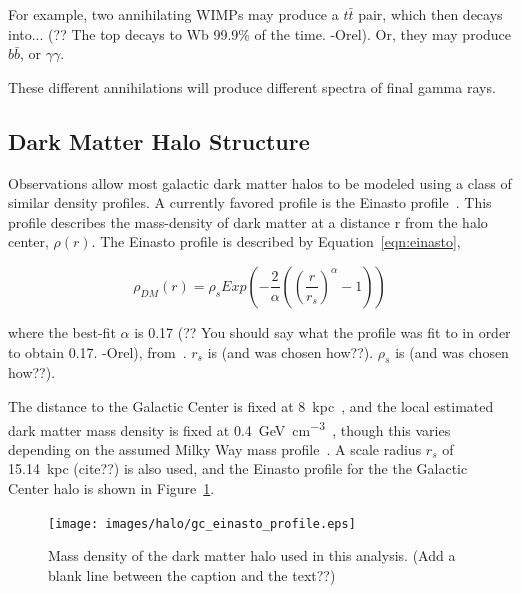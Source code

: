     For example, two annihilating WIMPs may produce a $t\bar{t}$ pair, which then decays into... {\color{red}(?? The top decays to Wb 99.9\% of the time. -Orel)}.
    Or, they may produce $b\bar{b}$, or $\gamma\gamma$.

    These different annihilations will produce different spectra of final gamma rays.
  
  \subsection{Dark Matter Halo Structure}\label{dm_spatial}
    Observations allow most galactic dark matter halos to be modeled using a class of similar density profiles.
    A currently favored profile is the Einasto profile~\cite{einastoprofile1,einastoprofile2}.
    This profile describes the mass-density of dark matter at a distance r from the halo center, $\rho(r)$.
    The Einasto profile is described by Equation~\ref{eqn:einasto},

    \begin{equation} \label{eqn:einasto}
      \rho_{DM} \left( r \right) = \rho_{s} Exp \left( - \frac{2}{\alpha} \left( {\left( \frac{r}{r_s} \right)}^{\alpha} - 1 \right) \right)
    \end{equation}
    
    where the best-fit $\alpha$ is {\color{red}0.17 (?? You should say what the profile was fit to in order to obtain 0.17. -Orel)}, from~\cite{PieriGalaxySims}.
    $r_s$ is {\color{red}(and was chosen how??)}.
    $\rho_s$ is {\color{red}(and was chosen how??)}.

    The distance to the Galactic Center is fixed at \SI{8}{kpc}~\cite{gc_distance_1,gc_distance_2,gc_distance_3}, and the local estimated dark matter mass density is fixed at \SI{0.4}{\GeV\per\cm^3}~\cite{local_dm_density}, though this varies depending on the assumed Milky Way mass profile~\cite{direct_dm_astrophysical_uncertainties}.
    A scale radius $r_s$ of \SI{15.14}{kpc} {\color{red}(cite??)} is also used, and the Einasto profile for the the Galactic Center halo is shown in Figure~\ref{fig:gchalo_density}.
  
    \begin{figure}[ht]
      \centering
      \texttt{[image: images/halo/gc\_einasto\_profile.eps]}
      \caption[Galactic Center Einasto Halo Density]{
        Mass density of the dark matter halo used in this analysis.
        {\color{red}(Add a blank line between the caption and the text??)}
        }
      \label{fig:gchalo_density}
    \end{figure}
    
